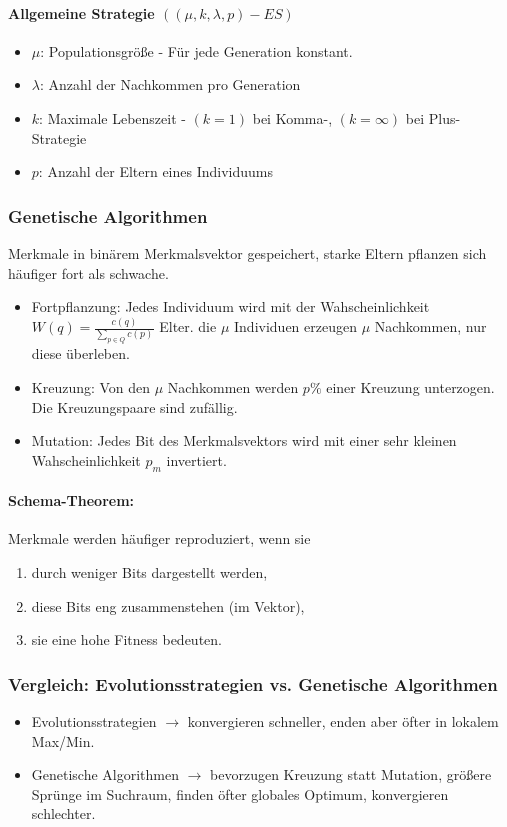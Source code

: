 \paragraph{Allgemeine Strategie $((\mu, k, \lambda, p) - ES)$}
\begin{itemize}
	\item \(\mu\): Populationsgröße - Für jede Generation konstant.
	\item \(\lambda\): Anzahl der Nachkommen pro Generation
	\item \(k\): Maximale Lebenszeit - \((k = 1)\) bei Komma-, \((k=\infty)\) bei Plus-Strategie
	\item \(p\): Anzahl der Eltern eines Individuums
\end{itemize}

\subsubsection{Genetische Algorithmen}
Merkmale in binärem Merkmalsvektor gespeichert, starke Eltern pflanzen sich häufiger fort als schwache.

\begin{itemize}
	\item Fortpflanzung: Jedes Individuum wird mit der Wahscheinlichkeit \(W(q) = \frac{c(q)}{\sum\limits_{p \in Q}c(p)}\) Elter. die \(\mu\) Individuen erzeugen \(\mu\) Nachkommen, nur diese überleben.
	\item Kreuzung: Von den \(\mu\) Nachkommen werden \(p\%\) einer Kreuzung unterzogen. Die Kreuzungspaare sind zufällig.
	\item Mutation: Jedes Bit des Merkmalsvektors wird mit einer sehr kleinen Wahscheinlichkeit \(p_m\) invertiert.
\end{itemize}

\paragraph{Schema-Theorem:} Merkmale werden häufiger reproduziert, wenn sie 
\begin{enumerate}
	\item durch weniger Bits dargestellt werden,
	\item diese Bits eng zusammenstehen (im Vektor),
	\item sie eine hohe Fitness bedeuten.
\end{enumerate}

\subsubsection{Vergleich: Evolutionsstrategien vs. Genetische Algorithmen}
\begin{itemize}
	\item Evolutionsstrategien $\rightarrow$ konvergieren schneller, enden aber öfter in lokalem Max/Min.\\
	\item Genetische Algorithmen $\rightarrow$ bevorzugen Kreuzung statt Mutation, größere Sprünge im Suchraum, finden öfter globales Optimum, konvergieren schlechter.
\end{itemize}

